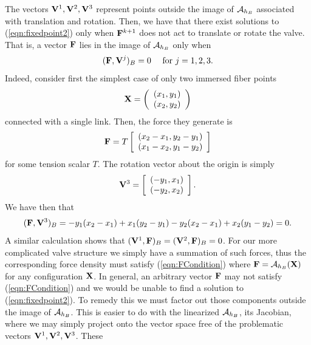 The vectors $\mathbf{V}^1,\mathbf{V}^2,\mathbf{V}^3$ represent points outside the image of $\mathcal{A}_{h_B}$ associated with translation and rotation. Then, 
we have that there exist solutions to (\ref{eqn:fixedpoint2}) only when $\mathbf{F}^{k+1}$ does not act to translate or rotate the valve. That is, a vector $\mathbf{F}$ lies in the image of $\mathcal{A}_{h_B}$ only when 
\begin{equation}
( \mathbf{F}, \mathbf{V}^j )_B = 0 \quad
\textrm{ for } j=1,2,3.
\label{eqn:FCondition}
\end{equation}
Indeed, consider first the simplest case of only two immersed fiber points
\begin{equation}
\mathbf{X}=
\left( \begin{array}{c}
(x_1,y_1)\\
(x_2,y_2)
\end{array} \right)
\end{equation}
connected with a single link. Then,  the force they generate is
\begin{equation}
\mathbf{F}=T
\left[ \begin{array}{c}
(x_2-x_1,y_2-y_1)\\
(x_1-x_2,y_1-y_2)
\end{array} \right]
\end{equation}
for some tension scalar $T$.
The rotation vector about the origin is simply 
\begin{equation}
\mathbf{V}^3=
\left[ \begin{array}{c}
(-y_1,x_1)\\
(-y_2,x_2)
\end{array} \right].
\end{equation}
We have then that
\begin{equation}
( \mathbf{F},\mathbf{V}^3 )_B =
-y_1(x_2-x_1) + x_1(y_2-y_1) - y_2(x_2-x_1) + x_2(y_1-y_2) = 0.
\end{equation}
A similar calculation shows that $( \mathbf{V}^1,\mathbf{F} )_B = ( \mathbf{V}^2,\mathbf{F} )_B = 0$.
For our more complicated valve structure  we simply have a summation of such forces, thus the
corresponding  force density must satisfy (\ref{eqn:FCondition}) where 
$\mathbf{F}=\mathcal{A}_{h_B}(\mathbf{X})$ for any configuration $\mathbf{X}$. In general, an arbitrary vector $\mathbf{F}$ may not satisfy (\ref{eqn:FCondition}) and we would be unable to find a solution to (\ref{eqn:fixedpoint2}). To remedy this we must factor out those components  outside the image of $\mathcal{A}_{h_B}$. This is easier to do with the linearized $\mathcal{A}_{h_B}$, its Jacobian, where we may simply project onto the vector space free of the problematic vectors $\mathbf{V}^1,\mathbf{V}^2,\mathbf{V}^3$. These 
